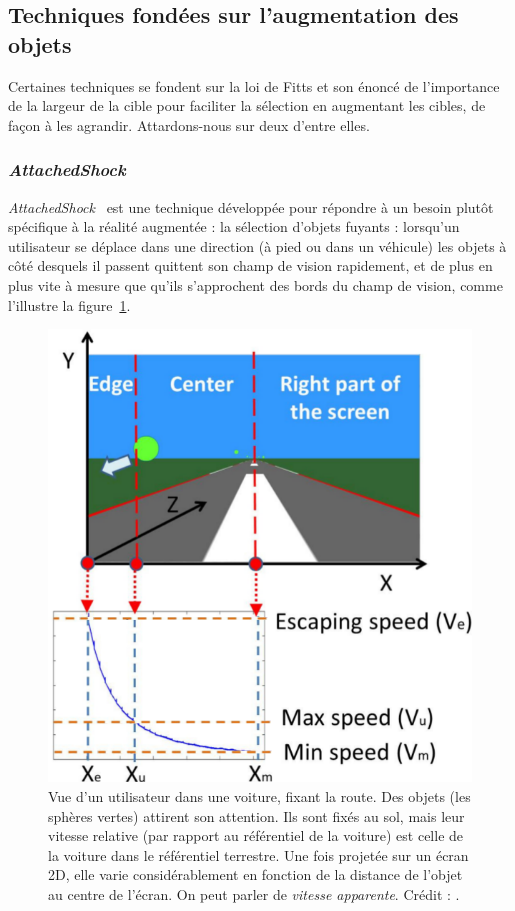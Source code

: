 	\subsection{Techniques fondées sur l'augmentation des objets}
	\label{sub:techAug}
	Certaines techniques se fondent sur la loi de Fitts et son énoncé de l'importance de la largeur de la cible pour faciliter la sélection en augmentant les cibles, de façon à les agrandir. Attardons-nous sur deux d'entre elles.

	\subsubsection{\emph{AttachedShock}}
	\emph{AttachedShock}~\cite{you2012attachedshock, you2014attachedshock} est une technique développée pour répondre à un besoin plutôt spécifique à la réalité augmentée : la sélection d'objets \og fuyants \fg{} : lorsqu'un utilisateur se déplace dans une direction (à pied ou dans un véhicule) les objets à côté desquels il passent quittent son champ de vision rapidement, et de plus en plus vite à mesure que qu'ils s'approchent des bords du champ de vision, comme l'illustre la figure~\ref{fig:as2dspeed}.

	\begin{figure}
		\includegraphics[scale=0.35]{figures/ch2/as2dspeed}
		\caption[\emph{AttachedShock}, profil de vitesse]{Vue d'un utilisateur dans une voiture, fixant la route. Des objets (les sphères vertes) attirent son attention. Ils sont fixés au sol, mais leur vitesse relative (par rapport au référentiel de la voiture) est celle de la voiture dans le référentiel terrestre. Une fois projetée sur un écran 2D, elle varie considérablement en fonction de la distance de l'objet au centre de l'écran. On peut parler de \emph{vitesse apparente}. Crédit : \cite{you2012attachedshock}.}
		\label{fig:as2dspeed}	
	\end{figure}
	
